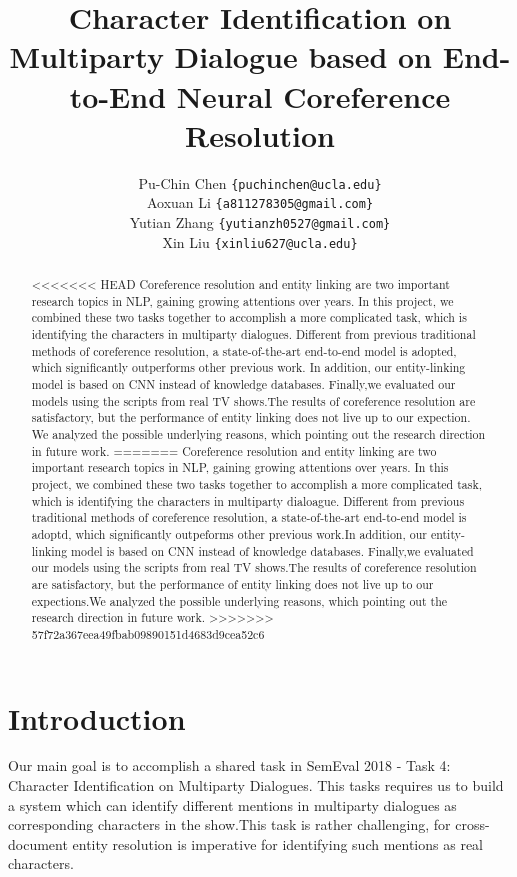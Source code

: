 \documentclass[11pt]{article}
\title{Character Identification on Multiparty Dialogue based on End-to-End Neural Coreference Resolution}
\author
{
   Pu-Chin Chen
  {\tt \{puchinchen@ucla.edu\}} \\
  Aoxuan Li 
  {\tt \{a811278305@gmail.com\}} \\
  Yutian Zhang
  {\tt \{yutianzh0527@gmail.com\}} \\
  Xin Liu
  {\tt \{xinliu627@ucla.edu\}} \\
}
\date{}
\begin{document}
\maketitle
\begin{abstract}
<<<<<<< HEAD
  Coreference resolution and entity linking are two important research topics in NLP, gaining growing attentions over years. In this project, we combined these two tasks together to accomplish a more complicated task, which is identifying the characters in multiparty dialogues. Different from previous traditional methods of coreference resolution, a state-of-the-art end-to-end model is adopted, which significantly outperforms other previous work. In addition, our entity-linking model is based on CNN instead of knowledge databases. Finally,we evaluated our models using the scripts from real TV shows.The results of coreference resolution are satisfactory, but the performance of entity linking does not live up to our expection. We analyzed the possible underlying reasons, which pointing out the research direction in future work.
=======
  Coreference resolution and entity linking are two important research topics in NLP, gaining growing attentions over years. In this project, we combined these two tasks together to accomplish a more complicated task, which is identifying the characters in multiparty dialoague. Different from previous traditional methods of coreference resolution, a state-of-the-art end-to-end model is adoptd, which significantly outpeforms other previous work.In addition, our entity-linking model is based on CNN instead of knowledge databases. Finally,we evaluated our models using the scripts from real TV shows.The results of coreference resolution are satisfactory, but the performance of entity linking does not live up to our expections.We analyzed the possible underlying reasons, which pointing out the research direction in future work.
>>>>>>> 57f72a367eea49fbab09890151d4683d9cea52c6
\end{abstract}

\section{Introduction}

Our main goal is to accomplish a shared task in SemEval 2018 - Task 4: Character Identification on Multiparty Dialogues. This tasks requires us to build a system which can identify different mentions in multiparty dialogues as corresponding characters in the show.This task is rather challenging, for cross-document entity resolution is imperative for identifying such mentions as real characters.
\end{document}

